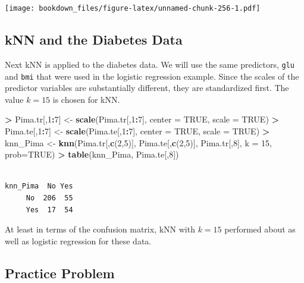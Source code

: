 \documentclass[]{krantz}
\makeatletter
\newenvironment{Shaded}{\begin{snugshade}}{\end{snugshade}}
\newcommand{\KeywordTok}[1]{\textcolor[rgb]{0.27,0.27,0.27}{\textbf{#1}}}
\newcommand{\DataTypeTok}[1]{\textcolor[rgb]{0.27,0.27,0.27}{#1}}
\newcommand{\DecValTok}[1]{\textcolor[rgb]{0.06,0.06,0.06}{#1}}
\newcommand{\StringTok}[1]{\textcolor[rgb]{0.5,0.5,0.5}{#1}}
\newcommand{\OtherTok}[1]{\textcolor[rgb]{0.37,0.37,0.37}{#1}}
\newcommand{\OperatorTok}[1]{\textcolor[rgb]{0.43,0.43,0.43}{\textbf{#1}}}
\newcommand{\NormalTok}[1]{#1}
\newenvironment{kframe}{%
\medskip{}
\setlength{\fboxsep}{.8em}
 \def\at@end@of@kframe{}%
 \ifinner\ifhmode%
  \def\at@end@of@kframe{\end{minipage}}%
  \begin{minipage}{\columnwidth}%
 \fi\fi%
 \def\FrameCommand##1{\hskip\@totalleftmargin \hskip-\fboxsep
 \colorbox{shadecolor}{##1}\hskip-\fboxsep
     \hskip-\linewidth \hskip-\@totalleftmargin \hskip\columnwidth}%
 \MakeFramed {\advance\hsize-\width
   \@totalleftmargin\z@ \linewidth\hsize
   \@setminipage}}%
 {\par\unskip\endMakeFramed%
 \at@end@of@kframe}
\renewenvironment{Shaded}{\begin{kframe}}{\end{kframe}}
\makeatother
\begin{document}
\texttt{[image: bookdown\_files/figure-latex/unnamed-chunk-256-1.pdf]}

\subsection{kNN and the Diabetes Data}\label{knn-and-the-diabetes-data}

Next kNN is applied to the diabetes data. We will use the same
predictors, \texttt{glu} and \texttt{bmi} that were used in the logistic
regression example. Since the scales of the predictor variables are
substantially different, they are standardized first. The value \(k=15\)
is chosen for kNN.

\begin{Shaded}
\begin{Highlighting}[]
\OperatorTok{>}\StringTok{ }\NormalTok{Pima.tr[,}\DecValTok{1}\OperatorTok{:}\DecValTok{7}\NormalTok{] <-}\StringTok{ }\KeywordTok{scale}\NormalTok{(Pima.tr[,}\DecValTok{1}\OperatorTok{:}\DecValTok{7}\NormalTok{], }\DataTypeTok{center =} \OtherTok{TRUE}\NormalTok{, }\DataTypeTok{scale =} \OtherTok{TRUE}\NormalTok{)}
\OperatorTok{>}\StringTok{ }\NormalTok{Pima.te[,}\DecValTok{1}\OperatorTok{:}\DecValTok{7}\NormalTok{] <-}\StringTok{ }\KeywordTok{scale}\NormalTok{(Pima.te[,}\DecValTok{1}\OperatorTok{:}\DecValTok{7}\NormalTok{], }\DataTypeTok{center =} \OtherTok{TRUE}\NormalTok{, }\DataTypeTok{scale =} \OtherTok{TRUE}\NormalTok{)}
\OperatorTok{>}\StringTok{ }\NormalTok{knn_Pima <-}\StringTok{ }\KeywordTok{knn}\NormalTok{(Pima.tr[,}\KeywordTok{c}\NormalTok{(}\DecValTok{2}\NormalTok{,}\DecValTok{5}\NormalTok{)], Pima.te[,}\KeywordTok{c}\NormalTok{(}\DecValTok{2}\NormalTok{,}\DecValTok{5}\NormalTok{)], Pima.tr[,}\DecValTok{8}\NormalTok{], }\DataTypeTok{k =} \DecValTok{15}\NormalTok{, }\DataTypeTok{prob=}\OtherTok{TRUE}\NormalTok{)}
\OperatorTok{>}\StringTok{ }\KeywordTok{table}\NormalTok{(knn_Pima, Pima.te[,}\DecValTok{8}\NormalTok{])}
\end{Highlighting}
\end{Shaded}

\begin{verbatim}
        
knn_Pima  No Yes
     No  206  55
     Yes  17  54
\end{verbatim}

At least in terms of the confusion matrix, kNN with \(k=15\) performed
about as well as logistic regression for these data.

\subsection{Practice Problem}\label{practice-problem-13}
\end{document}
